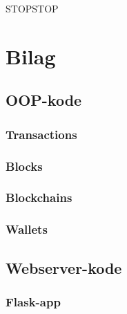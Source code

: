 \documentclass[a4paper, 8pt, oneside]{article} %
\begin{document}
STOPSTOP

\newpage
\appendix
\section{Bilag}
\subsection{OOP-kode}
\subsubsection{Transactions}

\subsubsection{Blocks}

\subsubsection{Blockchains}

\subsubsection{Wallets}

\subsection{Webserver-kode}
\subsubsection{Flask-app}


\newpage
\printbibliography
\end{document}
